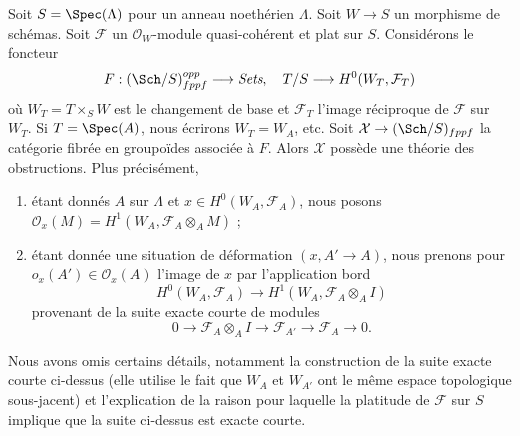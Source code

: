 \begin{example}
\label{example-global-sections}
Soit $S = \Spec(\Lambda)$ pour un anneau noethérien $\Lambda$. Soit
$W \to S$ un morphisme de schémas. Soit $\mathcal{F}$ un
$\mathcal{O}_W$-module quasi-cohérent et plat sur $S$. Considérons le foncteur
$$
F : (\Sch/S)_{fppf}^{opp} \longrightarrow \textit{Sets},
\quad
T/S \longrightarrow H^0(W_T, \mathcal{F}_T)
$$
où $W_T = T \times_S W$ est le changement de base et $\mathcal{F}_T$ l'image
réciproque de $\mathcal{F}$ sur $W_T$. Si $T = \Spec(A)$, nous écrirons
$W_T = W_A$, etc. Soit $\mathcal{X} \to (\Sch/S)_{fppf}$ la catégorie fibrée
en groupoïdes associée à $F$. Alors $\mathcal{X}$ possède une théorie des
obstructions. Plus précisément,
\begin{enumerate}
\item étant donnés $A$ sur $\Lambda$ et $x \in H^0(W_A, \mathcal{F}_A)$, nous
posons $\mathcal{O}_x(M) = H^1(W_A, \mathcal{F}_A \otimes_A M)$ ;
\item étant donnée une situation de déformation $(x, A' \to A)$, nous prenons
pour $o_x(A') \in \mathcal{O}_x(A)$ l'image de $x$ par l'application bord
$$
H^0(W_A, \mathcal{F}_A) \longrightarrow H^1(W_A, \mathcal{F}_A \otimes_A I)
$$
provenant de la suite exacte courte de modules
$$
0 \to \mathcal{F}_A \otimes_A I \to
\mathcal{F}_{A'} \to \mathcal{F}_A \to 0.
$$
\end{enumerate}
Nous avons omis certains détails, notamment la construction de la suite exacte
courte ci-dessus (elle utilise le fait que $W_A$ et $W_{A'}$ ont le même
espace topologique sous-jacent) et l'explication de la raison pour laquelle la
platitude de $\mathcal{F}$ sur $S$ implique que la suite ci-dessus est exacte
courte.
\end{example}

